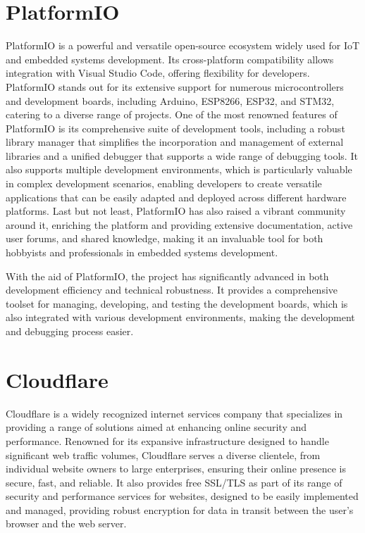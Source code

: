 \documentclass[../Main.tex]{subfiles}
\begin{document}
\section{PlatformIO}
PlatformIO is a powerful and versatile open-source ecosystem widely used for IoT and embedded systems development. Its cross-platform compatibility allows integration with Visual Studio Code, offering flexibility for developers. PlatformIO stands out for its extensive support for numerous microcontrollers and development boards, including Arduino, ESP8266, ESP32, and STM32, catering to a diverse range of projects\cite{platformio}. One of the most renowned features of PlatformIO is its comprehensive suite of development tools, including a robust library manager that simplifies the incorporation and management of external libraries and a unified debugger that supports a wide range of debugging tools. It also supports multiple development environments, which is particularly valuable in complex development scenarios, enabling developers to create versatile applications that can be easily adapted and deployed across different hardware platforms. Last but not least, PlatformIO has also raised a vibrant community around it, enriching the platform and providing extensive documentation, active user forums, and shared knowledge, making it an invaluable tool for both hobbyists and professionals in embedded systems development.

With the aid of PlatformIO, the project has significantly advanced in both development efficiency and technical robustness. It provides a comprehensive toolset for managing, developing, and testing the development boards, which is also integrated with various development environments, making the development and debugging process easier.

\section{Cloudflare}
Cloudflare is a widely recognized internet services company that specializes in providing a range of solutions aimed at enhancing online security and performance. Renowned for its expansive infrastructure designed to handle significant web traffic volumes, Cloudflare serves a diverse clientele, from individual website owners to large enterprises, ensuring their online presence is secure, fast, and reliable. It also provides free SSL/TLS as part of its range of security and performance services for websites, designed to be easily implemented and managed, providing robust encryption for data in transit between the user's browser and the web server\cite{cloudflare}. 
\end{document}
